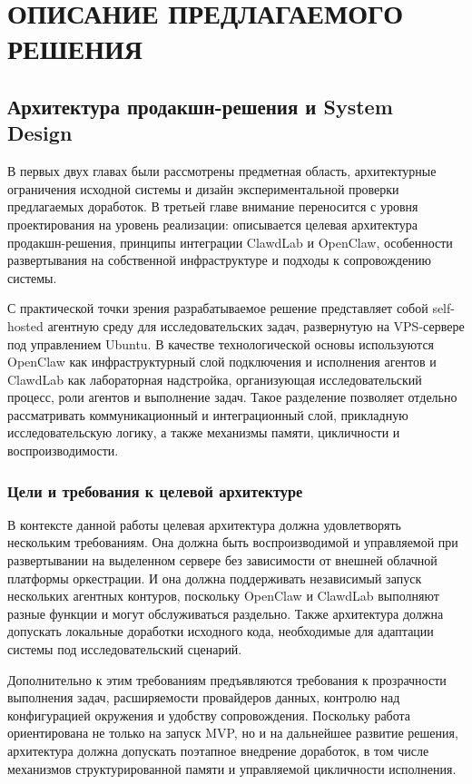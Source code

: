 \chapter{ОПИСАНИЕ ПРЕДЛАГАЕМОГО РЕШЕНИЯ}

\section{Архитектура продакшн-решения и System Design}

В первых двух главах были рассмотрены предметная область, архитектурные ограничения исходной системы и дизайн экспериментальной проверки предлагаемых доработок. В третьей главе внимание переносится с уровня проектирования на уровень реализации: описывается целевая архитектура продакшн-решения, принципы интеграции ClawdLab и OpenClaw, особенности развертывания на собственной инфраструктуре и подходы к сопровождению системы.

С практической точки зрения разрабатываемое решение представляет собой self-hosted агентную среду для исследовательских задач, развернутую на VPS-сервере под управлением Ubuntu. В качестве технологической основы используются OpenClaw как инфраструктурный слой подключения и исполнения агентов и ClawdLab как лабораторная надстройка, организующая исследовательский процесс, роли агентов и выполнение задач. Такое разделение позволяет отдельно рассматривать коммуникационный и интеграционный слой, прикладную исследовательскую логику, а также механизмы памяти, цикличности и воспроизводимости.

\subsection{Цели и требования к целевой архитектуре}

В контексте данной работы целевая архитектура должна удовлетворять нескольким требованиям. Она должна быть воспроизводимой и управляемой при развертывании на выделенном сервере без зависимости от внешней облачной платформы оркестрации. И она должна поддерживать независимый запуск нескольких агентных контуров, поскольку OpenClaw и ClawdLab выполняют разные функции и могут обслуживаться раздельно. Также архитектура должна допускать локальные доработки исходного кода, необходимые для адаптации системы под исследовательский сценарий.

Дополнительно к этим требованиям предъявляются требования к прозрачности выполнения задач, расширяемости провайдеров данных, контролю над конфигурацией окружения и удобству сопровождения. Поскольку работа ориентирована не только на запуск MVP, но и на дальнейшее развитие решения, архитектура должна допускать поэтапное внедрение доработок, в том числе механизмов структурированной памяти и управляемой цикличности исполнения.

